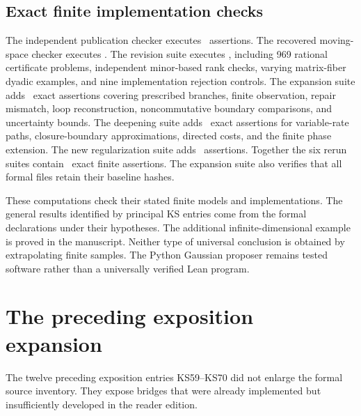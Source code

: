 \documentclass[11pt]{article}
\begin{document}
\subsection{Exact finite implementation checks}
The independent publication checker executes \EditionOriginalChecks\ assertions. The recovered moving-space checker executes \EditionRecoveredChecks. The revision suite executes \EditionRevisionChecks, including 969 rational certificate problems, independent minor-based rank checks, varying matrix-fiber dyadic examples, and nine implementation rejection controls. The expansion suite adds \EditionExpansionChecks\ exact assertions covering prescribed branches, finite observation, repair mismatch, loop reconstruction, noncommutative boundary comparisons, and uncertainty bounds. The deepening suite adds \EditionDeepeningChecks\ exact assertions for variable-rate paths, closure-boundary approximations, directed costs, and the finite phase extension. The new regularization suite adds \EditionRegularizationChecks\ assertions. Together the six rerun suites contain \EditionTotalChecks\ exact finite assertions. The expansion suite also verifies that all formal files retain their baseline hashes.

These computations check their stated finite models and implementations. The general results identified by principal KS entries come from the formal declarations under their hypotheses. The additional infinite-dimensional example is proved in the manuscript. Neither type of universal conclusion is obtained by extrapolating finite samples. The Python Gaussian proposer remains tested software rather than a universally verified Lean program.

\section{The preceding exposition expansion}
The twelve preceding exposition entries KS59--KS70 did not enlarge the formal source inventory. They expose bridges that were already implemented but insufficiently developed in the reader edition.
\end{document}
